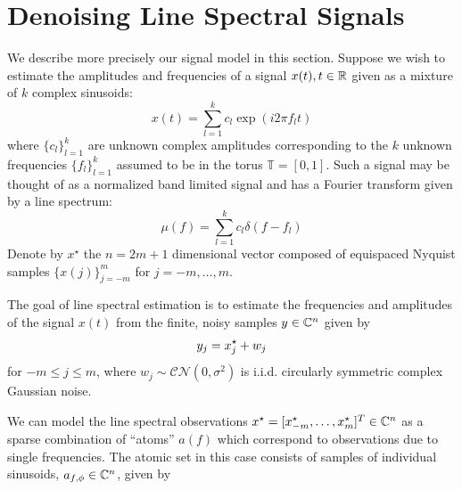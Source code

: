 
\section{Denoising Line Spectral Signals}
\label{sec:denoise-trig-moments} 

We describe more precisely our signal model in this section. Suppose we wish to
estimate the amplitudes and frequencies of a signal $x(t), t \in \mathbb{R}$ given as a
mixture of $k$ complex sinusoids:
\begin{equation*}
  x ( t) =  \sum_{l = 1}^k c_l \exp ( i 2 \pi f_l t)
\end{equation*}
where $\{ c_l \}_{l = 1}^k$ are unknown complex amplitudes corresponding to
the $k$ unknown frequencies $\{ f_l \}_{l = 1}^k$ assumed to be in the torus
$\mathbb{T} = [0, 1]$. Such a signal may be thought of as a normalized band
limited signal and has a Fourier transform given by a line spectrum:
\begin{equation}
\label{mu}
\mu(f) = \sum_{l=1}^k c_l\delta(f - f_l)
\end{equation}
Denote by $x^\star$ the $n = 2m+1$ dimensional vector composed of equispaced 
Nyquist samples $\{x(j)\}_{j=-m}^m$   for $j=-m,\ldots,m$.

The goal of line spectral estimation is to estimate the frequencies and 
amplitudes of the signal $x(t)$ from the finite, noisy samples $y \in \mathbb{C}^n$ 
given by
\[
  y_j  =  x_j^\star + w_j\\
\]
for $-m \leq j \leq m$, where $w_j \sim \mathcal{C}\mathcal{N}(0,\sigma^2)$ is 
i.i.d. circularly symmetric complex Gaussian noise. 

We can model the line spectral observations $x^\star = [x_{-m}^\star,
\ldots,x_{m}^\star]^T \in \mathbb{C}^n$ as a sparse combination of ``atoms'' $a(f)$ 
which correspond to observations due to single frequencies. The atomic set in this case consists of samples of individual sinusoids, $a_{f,\phi} \in \mathbb{C}^n$, given by

